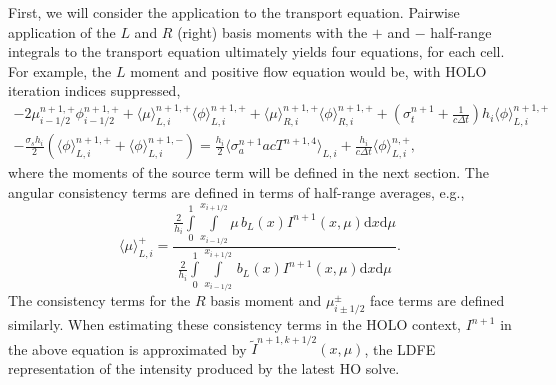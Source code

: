 \documentclass{mc2013}
\renewcommand{\d}{\mathrm{d}}
\newcommand{\mom}[1]{\langle #1 \rangle}
\newcommand{\xl}{{x_{i-1/2}}}
\newcommand{\xr}{{x_{i+1/2}}}
\begin{document}
First, we will consider the
application to the transport equation. 
Pairwise application of the $L$ and $R$ (right) basis
moments with the $+$ and $-$ half-range integrals to the transport equation
ultimately yields four
equations, for each cell.  For example, the $L$ moment and
positive flow equation would be, with HOLO iteration indices suppressed, 
\begin{multline}\label{lo_tran}
    -2{\mu}_{i-1/2}^{n+1,+} \phi_{i-1/2}^{n+1,+} + \mom {\mu}_{L,i}^{n+1,+}
  \mom{\phi}_{L,i}^{n+1,+}
  +  \mom\mu_{R,i}^{n+1,+}
  \mom{\phi}_{R,i}^{n+1,+} +  \left(\sigma_t^{n+1}+\frac{1}{c \Delta t} \right) h_i 
  \mom{\phi}_{L,i}^{n+1,+} \\-  \frac{\sigma_s h_i}{2} \left( \mom{\phi}_{L,i}^{n+1,+} +
  \mom\phi_{L,i}^{n+1,-}\right) = \frac{h_i}{2} \mom{\sigma_a^{n+1} a c T^{n+1,4}}_{L,i} +
  \frac{h_i}{c\Delta t}\mom{\phi}_{L,i}^{n,+},
\end{multline}
where the moments of the source term will be defined in the next section.
The angular consistency terms are defined in terms of half-range averages, e.g.,
\begin{equation}\label{const}
\mom{{\mu}}_{L,i}^+ =  \frac{
{\displaystyle \frac{2}{h_i}} \int\limits_0^1 \int\limits_\xl^\xr \mu \, b_L(x)
I^{n+1}(x,\mu) \d x \d \mu } 
{{\displaystyle \frac{2}{h_i}} \int\limits_0^1 \int\limits_\xl^\xr \, b_L(x)
I^{n+1}(x,\mu) \d x \d \mu } .
\end{equation}
The consistency terms for the $R$ basis moment and $\mu_{i\pm1/2}^\pm$ face
terms are defined similarly. When estimating these consistency terms in the HOLO
context, $I^{n+1}$ in the above equation is approximated by
$\tilde{I}^{n+1,k+1/2}(x,\mu)$, the LDFE representation of the intensity produced
by the latest HO solve.
\end{document}
